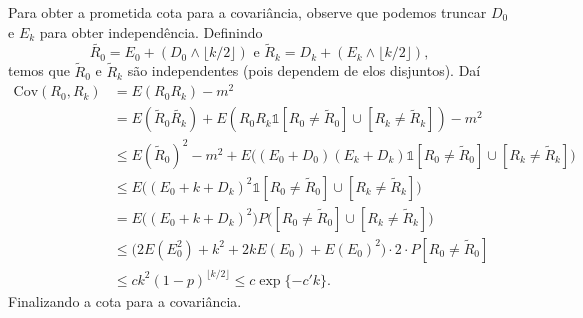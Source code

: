 \documentclass[reqno, final]{book}
\newcommand*\1{\mathds{1}}
\begin{document}
Para obter a prometida cota para a covariância, observe que podemos truncar $D_0$ e $E_k$ para obter independência.
Definindo
\begin{equation}
  \tilde{R_0} = E_0 + ( D_0 \wedge \lfloor k/2 \rfloor ) \text{ e } \tilde{R}_k = D_k + ( E_k \wedge \lfloor k/2 \rfloor ),
\end{equation}
temos que $\tilde{R}_0$ e $\tilde{R}_k$ são independentes (pois dependem de elos disjuntos).
Daí
\begin{equation}
  \begin{split}
    \text{Cov}(R_0, R_k) & = E(R_0 R_k) - m^2\\
    & = E(\tilde{R}_0 \tilde{R_k}) + E(R_0 R_k \1{[R_0 \neq \tilde{R}_0] \cup [R_k \neq \tilde{R}_k]}) - m^2\\
    & \leq E(\tilde{R}_0)^2 - m^2 + E\big( (E_0 + D_0) (E_k + D_k) \1{[R_0 \neq \tilde{R}_0] \cup [R_k \neq \tilde{R}_k]}\big)\\
    & \leq E\big( (E_0 + k + D_k)^2 \1{[R_0 \neq \tilde{R}_0] \cup [R_k \neq \tilde{R}_k]}\big)\\
    & = E\big( (E_0 + k + D_k)^2 \big) P\big([R_0 \neq \tilde{R}_0] \cup[R_k \neq \tilde{R}_k]\big)\\
    & \leq \big( 2 E(E_0^2) + k^2 + 2k E(E_0) + E(E_0)^2 \big) \cdot 2 \cdot P[R_0 \neq \tilde{R}_0]\\
    & \leq c k^2 (1-p)^{\lfloor k/2 \rfloor} \leq c \exp \{-c' k\}.
  \end{split}
\end{equation}
Finalizando a cota para a covariância.

\clearpage

\printindex
\end{document}
